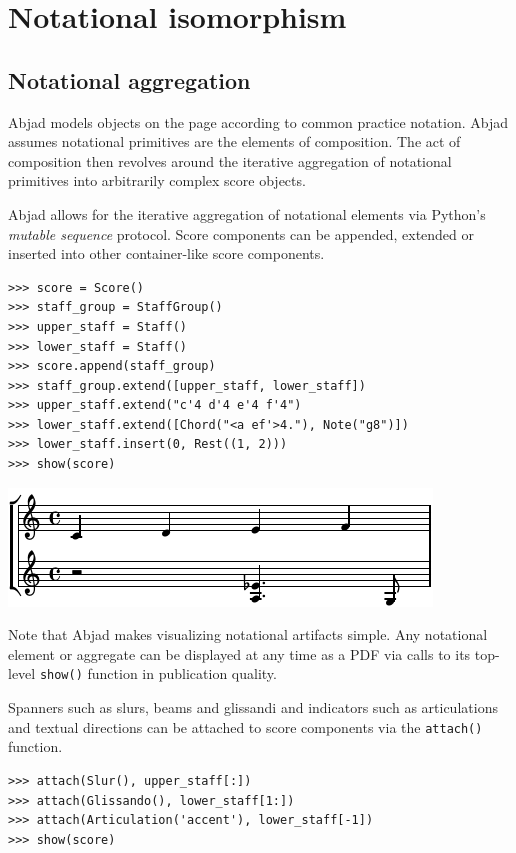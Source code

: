 \section{Notational isomorphism}\label{sec:notational_isomorphism}

\subsection{Notational aggregation}

Abjad models objects on the page according to common practice notation. Abjad
assumes notational primitives are the elements of composition. The act of
composition then revolves around the iterative aggregation of notational
primitives into arbitrarily complex score objects.

Abjad allows for the iterative aggregation of notational elements via Python's
\emph{mutable sequence} protocol. Score components can be appended, extended or
inserted into other container-like score components.

\begin{lstlisting}
>>> score = Score()
>>> staff_group = StaffGroup()
>>> upper_staff = Staff()
>>> lower_staff = Staff()
>>> score.append(staff_group)
>>> staff_group.extend([upper_staff, lower_staff])
>>> upper_staff.extend("c'4 d'4 e'4 f'4")
>>> lower_staff.extend([Chord("<a ef'>4."), Note("g8")])
>>> lower_staff.insert(0, Rest((1, 2)))
>>> show(score)
\end{lstlisting}

\includegraphics[scale=1.0]{images/section_2_notational_isomorphism-1.pdf}


Note that Abjad makes visualizing notational artifacts simple. Any notational
element or aggregate can be displayed at any time as a PDF via calls to its
top-level \texttt{show()} function in publication quality.

Spanners such as slurs, beams and glissandi and indicators such as
articulations and textual directions can be attached to score components via
the \texttt{attach()} function.

\begin{lstlisting}
>>> attach(Slur(), upper_staff[:])
>>> attach(Glissando(), lower_staff[1:])
>>> attach(Articulation('accent'), lower_staff[-1])
>>> show(score)
\end{lstlisting}

